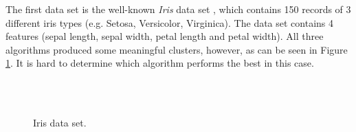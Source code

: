 The first data set is the well-known \textit{Iris} data set \cite{iris}, which contains 150 records of 3 different iris types (e.g. Setosa, Versicolor, Virginica). The data set contains 4 features (sepal length, sepal width, petal length and petal width). All three algorithms produced some meaningful clusters, however, as can be seen in Figure \ref{fig:real_world_iris}. It is hard to determine which algorithm performs the best in this case.
\begin{figure}[H]
    \vspace*{-0.5cm}
    \centering
    ~~~~
    \\
    ~~~~
    \caption{Iris data set.}
    \label{fig:real_world_iris}
    \vspace*{-0.5cm}
\end{figure}

